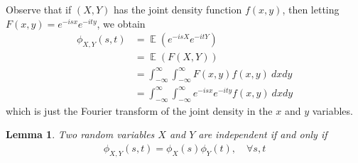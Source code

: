 \documentclass[12pt]{article}
\DeclareMathOperator{\ex}{\mathbb{E}}
\theoremstyle{plain}
\newtheorem{lemma}[theorem]{Lemma}
\theoremstyle{definition}
\theoremstyle{remark}
\numberwithin{equation}{section}  %
\begin{document}
Observe that if $(X, Y)$ has the joint density function $f(x, y)$, then
letting $F(x, y) = e^{-isx} e^{-ity}$, we obtain
\begin{equation*}
	\begin{split}
		\phi_{X,Y}(s,t) & = \ex(e^{-isX} e^{-itY})
		\\
		& = \ex(F(X, Y))
		\\
		& = \int_{-\infty}^{\infty}\int_{-\infty}^{\infty} F(x, y) f(x, y) \ dx  dy
		\\
		& = \int_{-\infty}^{\infty}\int_{-\infty}^{\infty} e^{-isx} e^{-ity}
		f(x, y) \ dx  dy
	\end{split}
\end{equation*}
which is just the Fourier transform of the joint density in the $x$ and $y$
variables.
\begin{lemma}\label{lem:char-ind}
	Two random variables $X$ and $Y$ are independent if and only if
	\begin{equation*}
		\begin{split}
			\phi_{X, Y}(s, t)= \phi_{X}(s) \phi_{Y}(t), \quad \forall s, t
		\end{split}
	\end{equation*}
\end{lemma}
\end{document}
